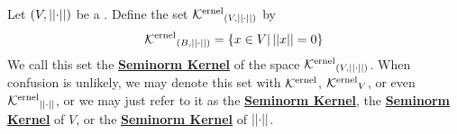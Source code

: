 \label{def:seminormkernel}
\newcommand{\SeminormKernel}[0]{\textbf{\hyperref[def:seminormkernel]{Seminorm Kernel}}\xspace}
\newcommand{\SeminormKernels}[0]{\textbf{\hyperref[def:seminormkernel]{Seminorm Kernels}}\xspace}
\newcommand{\Ker}[0]{\textbf{\ensuremath{\mathcal{K}\rm^{ernel}}}\xspace}


\begin{df}
Let $(V, \left|\left| \cdot \right|\right|)$ be a \SeminormedSpace. 
Define the set $\Ker_{(V,\norm{\cdot})}$ by 
\begin{equation}
\Ker_{(B,\norm{\cdot})}=\{x \in V | \norm{x}=0\}
\end{equation}
We call this set the \SeminormKernel of the space $\Ker_{(V,\norm{\cdot})}$. 
When confusion is unlikely, we may denote this set with
$\Ker$, $\Ker_V$, or even $\Ker_{\norm{\cdot}}$, or we may just refer to it
as the \SeminormKernel, the \SeminormKernel of $V$, or the \SeminormKernel of $\left|\left| \cdot \right|\right|$. 
\end{df}

